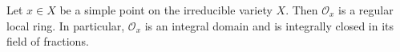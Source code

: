 Let $x \in X$ be a simple point on the irreducible variety $X$. Then $\mathcal{O}_x$ is a regular local ring. In particular, $\mathcal{O}_x$ is an integral domain and is integrally closed in its field of fractions.
